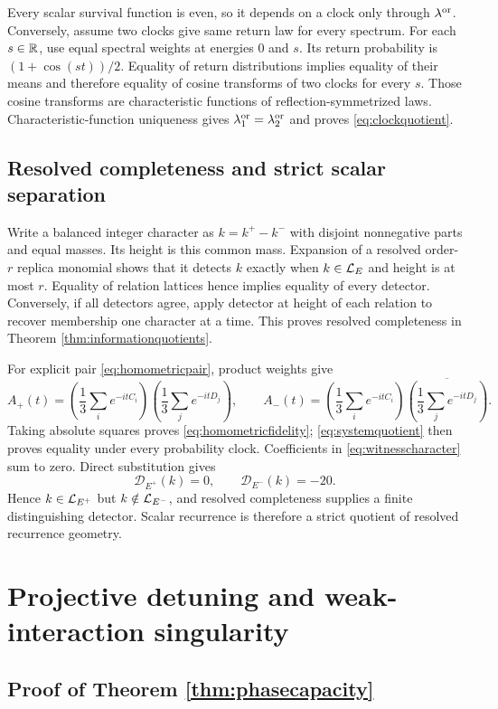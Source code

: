 Every scalar survival function is even, so it depends on a clock only through
$\lambda^{\rm or}$.  Conversely, assume two clocks give same return law for
every spectrum.  For each $s\in\mathbb R$, use equal spectral weights at energies
$0$ and $s$.  Its return probability is
$(1+\cos(st))/2$.  Equality of return distributions implies equality of
their means and therefore equality of cosine transforms of two clocks for
every $s$.  Those cosine transforms are characteristic functions of
reflection-symmetrized laws.  Characteristic-function uniqueness gives
$\lambda_1^{\rm or}=\lambda_2^{\rm or}$ and proves
\eqref{eq:clockquotient}.

\subsection{Resolved completeness and strict scalar separation}

Write a balanced integer character as $k=k^+-k^-$ with disjoint nonnegative
parts and equal masses.  Its height is this common mass.  Expansion of a
resolved order-$r$ replica monomial shows that it detects $k$ exactly when
$k\in\mathcal L_E$ and height is at most $r$.  Equality of relation lattices hence
implies equality of every detector.  Conversely, if all detectors agree,
apply detector at height of each relation to recover membership one
character at a time.  This proves resolved completeness in Theorem
\ref{thm:informationquotients}.

For explicit pair \eqref{eq:homometricpair}, product weights give
\[
 A_+(t)=\left(\frac13\sum_i e^{-itC_i}\right)
        \left(\frac13\sum_j e^{-itD_j}\right),\qquad
 A_-(t)=\left(\frac13\sum_i e^{-itC_i}\right)
        \overline{\left(\frac13\sum_j e^{-itD_j}\right)}.
\]
Taking absolute squares proves \eqref{eq:homometricfidelity};
\eqref{eq:systemquotient} then proves equality under every probability
clock.  Coefficients in \eqref{eq:witnesscharacter} sum to zero.  Direct
substitution gives
\[
 \mathcal D_{E^+}(k)=0,
 \qquad \mathcal D_{E^-}(k)=-20.
\]
Hence $k\in\mathcal L_{E^+}$ but $k\notin\mathcal L_{E^-}$, and resolved completeness
supplies a finite distinguishing detector.  Scalar recurrence is therefore
a strict quotient of resolved recurrence geometry.

\section{Projective detuning and weak-interaction singularity}

\subsection{Proof of Theorem \ref{thm:phasecapacity}}

